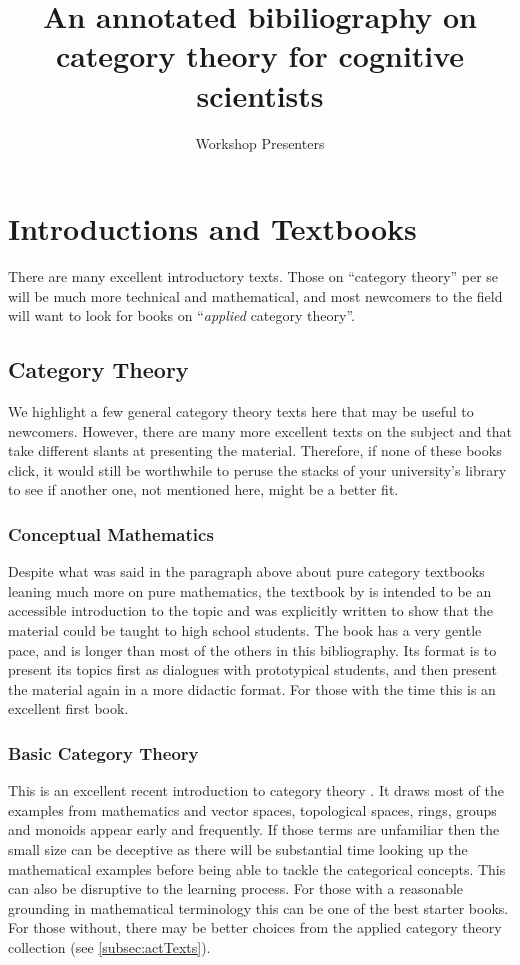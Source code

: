 \documentclass{article}
\author{Workshop Presenters}
\title{An annotated bibiliography on category theory for cognitive scientists}
\begin{document}
\maketitle

\section{Introductions and Textbooks}
\label{sec:intr-textb}

There are many excellent introductory texts. Those on ``category theory'' per se will be much more technical and mathematical, and most newcomers to the field will want to look for books on ``\emph{applied} category theory''. 

\subsection{Category Theory }
\label{sec:category-theory-}

We highlight a few general category theory texts here that may be useful to newcomers. However, there are many more excellent texts on the subject and that take different slants at presenting the material. Therefore, if none of these books click, it would still be worthwhile to peruse the stacks of your university's library to see if another one, not mentioned here, might be a better fit.

\subsubsection{Conceptual Mathematics}
Despite what was said in the paragraph above about pure category textbooks leaning much more on pure mathematics, the textbook by \textcite{lawvere09_concep} is intended to be an accessible introduction to the topic and was explicitly written to show that the material could be taught to high school students. The book has a very gentle pace, and is longer than most of the others in this bibliography. Its format is to present its topics first as dialogues with prototypical students, and then present the material again in a more didactic format. For those with the time this is an excellent first book.

\subsubsection{Basic Category Theory}
This is an excellent recent introduction to category theory \autocite{tom16_basic_categ_theor}. It draws most of the examples from mathematics and vector spaces, topological spaces, rings, groups and monoids appear early and frequently. If those terms are unfamiliar then the small size can be deceptive as there will be substantial time looking up the mathematical examples before being able to tackle the categorical concepts. This can also be disruptive to the learning process. For those with a reasonable grounding in mathematical terminology this can be one of the best starter books. For those without, there may be better choices from the applied category theory collection (see \ref{subsec:actTexts}). 
\end{document}
